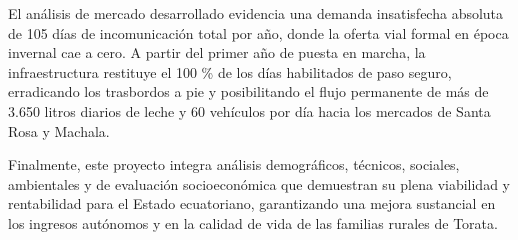 El análisis de mercado desarrollado evidencia una demanda insatisfecha absoluta de 105 días de incomunicación total por año, donde la oferta vial formal en época invernal cae a cero. A partir del primer año de puesta en marcha, la infraestructura restituye el 100 \% de los días habilitados de paso seguro, erradicando los trasbordos a pie y posibilitando el flujo permanente de más de 3.650 litros diarios de leche y 60 vehículos por día hacia los mercados de Santa Rosa y Machala.

Finalmente, este proyecto integra análisis demográficos, técnicos, sociales, ambientales y de evaluación socioeconómica que demuestran su plena viabilidad y rentabilidad para el Estado ecuatoriano, garantizando una mejora sustancial en los ingresos autónomos y en la calidad de vida de las familias rurales de Torata.

\par
\endgroup

\clearpage
